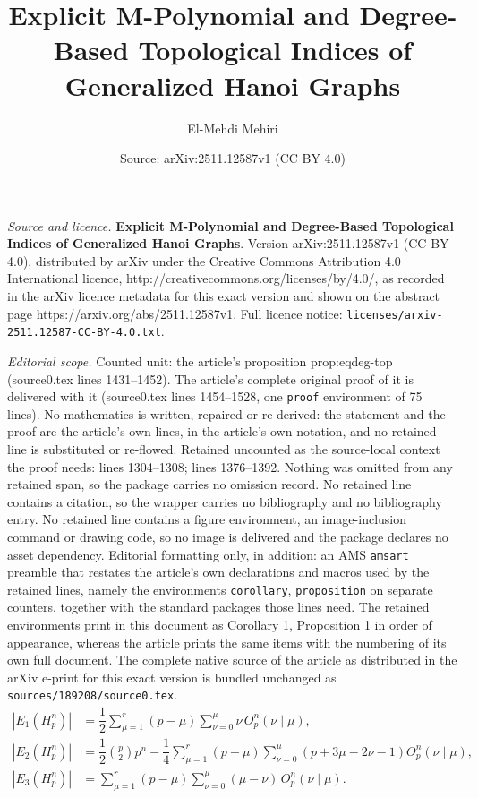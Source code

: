 \documentclass[10pt,a4paper]{amsart}
\title{\textbf{Explicit M-Polynomial and Degree-Based Topological Indices of Generalized Hanoi Graphs}}
\author{El-Mehdi Mehiri}
\date{Source: arXiv:2511.12587v1 (CC BY 4.0)}
\begin{document}
\maketitle

\noindent\emph{Source and licence.} \textbf{Explicit M-Polynomial and Degree-Based Topological Indices of Generalized Hanoi Graphs}. Version arXiv:2511.12587v1 (CC BY 4.0), distributed by arXiv under the Creative Commons Attribution 4.0 International licence, http://creativecommons.org/licenses/by/4.0/, as recorded in the arXiv licence metadata for this exact version and shown on the abstract page https://arxiv.org/abs/2511.12587v1. Full licence notice: \texttt{licenses/arxiv-2511.12587-CC-BY-4.0.txt}.\par\smallskip

\noindent\textit{Editorial scope.} Counted unit: the article's proposition prop:eqdeg-top (source0.tex lines 1431--1452). The article's complete original proof of it is delivered with it (source0.tex lines 1454--1528, one \texttt{proof} environment of 75 lines). No mathematics is written, repaired or re-derived: the statement and the proof are the article's own lines, in the article's own notation, and no retained line is substituted or re-flowed.  Retained uncounted as the source-local context the proof needs: lines 1304--1308; lines 1376--1392.  Nothing was omitted from any retained span, so the package carries no omission record.  No retained line contains a citation, so the wrapper carries no bibliography and no bibliography entry.  No retained line contains a figure environment, an image-inclusion command or drawing code, so no image is delivered and the package declares no asset dependency.  Editorial formatting only, in addition: an AMS \texttt{amsart} preamble that restates the article's own declarations and macros used by the retained lines, namely the environments \texttt{corollary}, \texttt{proposition} on separate counters, together with the standard packages those lines need.  The retained environments print in this document as Corollary 1, Proposition 1 in order of appearance, whereas the article prints the same items with the numbering of its own full document.  The complete native source of the article as distributed in the arXiv e-print for this exact version is bundled unchanged as \texttt{sources/189208/source0.tex}.
\begin{align}
    |E_1(H_p^n)| &= \dfrac{1}{2} \sum_{\mu = 1}^{r} (p - \mu) \sum_{\nu = 0}^{\mu} \nu \, O_p^n(\nu \mid \mu),\label{eq:E1} \\
    |E_2(H_p^n)| &= \dfrac{1}{2} \binom{p}{2} p^n - \dfrac{1}{4} \sum_{\mu = 1}^{r} (p - \mu) \sum_{\nu = 0}^{\mu} \left(p + 3\mu - 2\nu - 1 \right) O_p^n(\nu \mid \mu),\label{eq:E2} \\
    |E_3(H_p^n)| &= \sum_{\mu = 1}^{r} (p - \mu) \sum_{\nu = 0}^{\mu} (\mu - \nu) \, O_p^n(\nu \mid \mu).\label{eq:E3}
\end{align}
\end{document}
